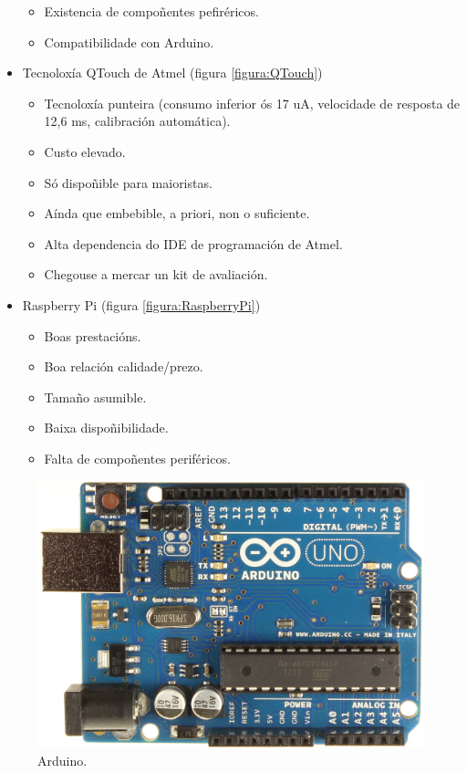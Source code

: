 \begin{itemize}
\begin{itemize}
          \item Existencia de compoñentes pefiréricos.
          \item Compatibilidade con Arduino.
         \end{itemize}
   \item Tecnoloxía QTouch de Atmel \cite{QTouch} (figura \ref{figura:QTouch})
         \begin{itemize}
          \item Tecnoloxía punteira (consumo inferior ós 17 uA, velocidade de
                resposta de 12,6 ms, calibración automática).
          \item Custo elevado.
          \item Só dispoñible para maioristas.
          \item Aínda que embebible, a priori, non o suficiente.
          \item Alta dependencia do IDE de programación de Atmel.
          \item Chegouse a mercar un kit de avaliación.
         \end{itemize}
   \item Raspberry Pi \cite{RaspberryPi} (figura \ref{figura:RaspberryPi})
         \begin{itemize}
          \item Boas prestacións.
          \item Boa relación calidade/prezo.
          \item Tamaño asumible.
          \item Baixa dispoñibilidade.
          \item Falta de compoñentes periféricos.
         \end{itemize}
  \end{itemize}

  \begin{figure}[htbp]
   \centering
   \includegraphics[scale=0.1,keepaspectratio=true]{./imagenes/arduino.jpg}
   \caption{Arduino.}
   \label{figura:Arduino}
  \end{figure}

